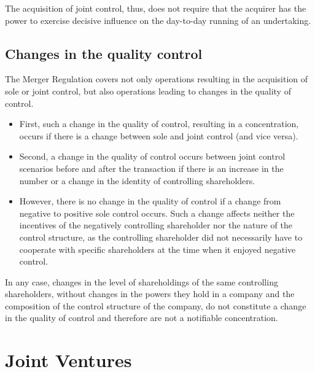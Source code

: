         The acquisition of joint control, thus, does not require that the acquirer has the power to exercise decisive influence on the day-to-day running of an undertaking.

    \subsection{Changes in the quality control}

        The Merger Regulation covers not only operations resulting in the acquisition of sole or joint control, but also operations leading to changes in the quality of control.

        \begin{itemize}
            \item First, such a change in the quality of control, resulting in a concentration, occurs if there is a change between sole and joint control (and vice versa).
            \item Second, a change in the quality of control occurs between joint control scenarios before and after the transaction if there is an increase in the number or a change in the identity of controlling shareholders.
            
            \item However, there is no change in the quality of control if a change from negative to positive sole control occurs. Such a change affects neither the incentives of the negatively controlling shareholder nor the nature of the control structure, as the controlling shareholder did not necessarily have to cooperate with specific shareholders at the time when it enjoyed negative control.
        \end{itemize}
        
        In any case, changes in the level of shareholdings of the same controlling shareholders, without changes in the powers they hold in a company and the composition of the control structure of the company, do not constitute a change in the quality of control and therefore are not a notifiable concentration.

\section{Joint Ventures}

